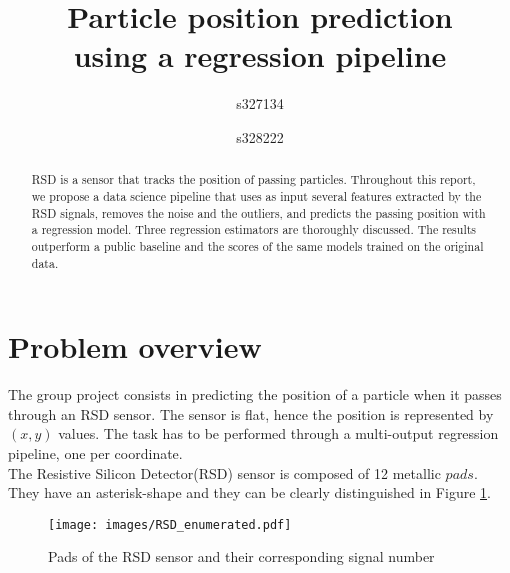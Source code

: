 \documentclass[conference]{IEEEtran}
\begin{document}
\title{Particle position prediction \\ using a regression pipeline}

\author{
s327134 \\
\and
{}
s328222 \\
}

\maketitle

\begin{abstract}
RSD is a sensor that tracks the position of passing particles. Throughout this report, we propose a data science pipeline that uses as input several features extracted by the RSD signals, removes the noise and the outliers, and predicts the passing position with a regression model. Three regression estimators are thoroughly discussed. The results outperform a public baseline and the scores of the same models trained on the original data.
\end{abstract}

\section{Problem overview}
\label{sec:problemOverview}
The group project consists in predicting the position of a particle when it passes through an RSD sensor. The sensor is flat, hence the position is represented by $(x, y)$ values. 
The task has to be performed through a multi-output regression pipeline, one per coordinate. \\
The Resistive Silicon Detector(RSD) sensor is composed of 12 metallic $pads$. They have an asterisk-shape and they can be clearly distinguished in Figure \ref{fig:rsd}.\\

\begin{figure}[htbp]
\centerline{\texttt{[image: images/RSD\_enumerated.pdf]}}
\caption{Pads of the RSD sensor and their corresponding signal number}
\label{fig:rsd}
\end{figure}
\end{document}
